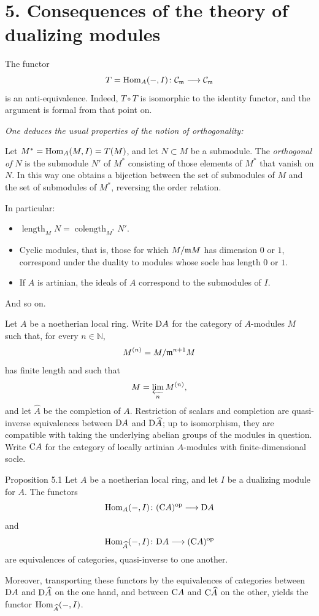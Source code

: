 
\section*{5. Consequences of the theory of dualizing modules}

The functor
\[
  T=\operatorname{Hom}_A(-,I)\colon \mathcal C_{\mathfrak m}\longrightarrow\mathcal C_{\mathfrak m}
\]
is an anti-equivalence. Indeed, $T\circ T$ is isomorphic to the identity
functor, and the argument is formal from that point on.

\emph{One deduces the usual properties of the notion of orthogonality:}

Let $M^*=\operatorname{Hom}_A(M,I)=T(M)$, and let $N\subset M$ be a submodule. The
\emph{orthogonal of} $N$ is the submodule $N'$ of $M^*$ consisting of those
elements of $M^*$ that vanish on $N$. In this way one obtains a bijection
between the set of submodules of $M$ and the set of submodules of $M^*$,
reversing the order relation.

In particular:
\begin{itemize}[leftmargin=2.3em]
\item $\operatorname{length}_{M}N=
  \operatorname{colength}_{M^*}N'$.
\item Cyclic modules, that is, those for which $M/\mathfrak m M$ has dimension
  $0$ or $1$, correspond under the duality to modules whose socle has length
  $0$ or $1$.
\item If $A$ is artinian, the ideals of $A$ correspond to the submodules of
  $I$.
\end{itemize}
And so on.

Let $A$ be a noetherian local ring. Write $\mathrm D A$ for the category of
$A$-modules $M$ such that, for every $n\in\mathbb N$,
\[
  M^{(n)}=M/\mathfrak m^{n+1}M
\]
has finite length and such that
\[
  M=\varprojlim_n M^{(n)},
\]
and let $\widehat A$ be the completion of $A$. Restriction of scalars and
completion are quasi-inverse equivalences between $\mathrm D A$ and $\mathrm D\widehat A$; up to
isomorphism, they are compatible with taking the underlying abelian groups of
the modules in question. Write $\mathrm C A$ for the category of locally artinian
$A$-modules with finite-dimensional socle.

\begin{sgastatement}{Proposition 5.1}
Let $A$ be a noetherian local ring, and let $I$ be a dualizing module for
$A$. The functors
\[
  \operatorname{Hom}_A(-,I)\colon (\mathrm C A)^{\mathrm{op}}\longrightarrow\mathrm D A
\]
and
\[
  \operatorname{Hom}_{\widehat A}(-,I)\colon \mathrm D A\longrightarrow(\mathrm C A)^{\mathrm{op}}
\]
are equivalences of categories, quasi-inverse to one another.

Moreover, transporting these functors by the equivalences of categories
between $\mathrm D A$ and $\mathrm D\widehat A$ on the one hand, and between $\mathrm C A$ and $\mathrm C\widehat A$ on
the other, yields the functor $\operatorname{Hom}_{\widehat A}(-,I)$.
\end{sgastatement}

